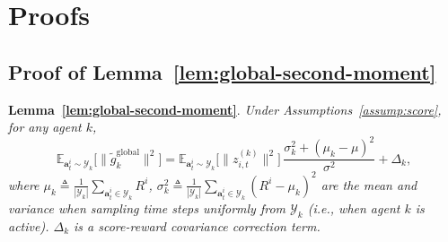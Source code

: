 
\section{Proofs}
\label{app:proofs}  
\subsection{Proof of Lemma~\ref{lem:global-second-moment}}
\label{app:proof_lemma_global_second_moment}

\textbf{Lemma~\ref{lem:global-second-moment}}.
\textit{
Under Assumptions~\ref{assump:score}, for any agent $k$,
\begin{equation}
\nonumber
\mathbb{E}_{\bm{a}_t^i\sim \mathcal{Y}_k}\big[\|\tilde{g}_k^{\mathrm{global}}\|^2\big]
{=} \mathbb{E}_{\bm{a}_t^i\sim \mathcal{Y}_k}\big[\|z_{i,t}^{(k)}\|^2\big]\,
  \frac{\sigma_k^2 + (\mu_k - \mu)^2}{\sigma^2} + \Delta_k,
\end{equation}
where $\mu_k \triangleq \frac{1}{|\mathcal{Y}_k|}\sum_{\bm{a}_t^i\in \mathcal{Y}_k} R^i$, $\sigma_k^2 \triangleq \frac{1}{|\mathcal{Y}_k|}\sum_{\bm{a}_t^i\in \mathcal{Y}_k} (R^i - \mu_k)^2$
are the mean and variance when sampling
time steps uniformly from $\mathcal{Y}_k$ (i.e., when agent $k$ is active). $\Delta_k$ is a score-reward covariance correction term.
}

